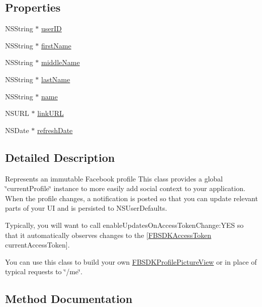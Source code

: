 \subsection*{Properties}
\begin{DoxyCompactItemize}
\item 
N\+S\+String $\ast$ \hyperlink{interface_f_b_s_d_k_profile_a26a7f698acf093c0d7e2be81532d1d67}{user\+I\+D}
\item 
N\+S\+String $\ast$ \hyperlink{interface_f_b_s_d_k_profile_a31272e40b64d9f34df275b6fcd79fc7b}{first\+Name}
\item 
N\+S\+String $\ast$ \hyperlink{interface_f_b_s_d_k_profile_a27ffc05364ad2ebef222c9fb97a1369b}{middle\+Name}
\item 
N\+S\+String $\ast$ \hyperlink{interface_f_b_s_d_k_profile_ae6eb49fec06e9a53af370a18ab54e4a1}{last\+Name}
\item 
N\+S\+String $\ast$ \hyperlink{interface_f_b_s_d_k_profile_ac9dc573eea0b89119bc6564618cf959f}{name}
\item 
N\+S\+U\+R\+L $\ast$ \hyperlink{interface_f_b_s_d_k_profile_ad18140af79f94f03a1317ff4cb1a5b31}{link\+U\+R\+L}
\item 
N\+S\+Date $\ast$ \hyperlink{interface_f_b_s_d_k_profile_aef99209a7a849699d65189f37d90cfb7}{refresh\+Date}
\end{DoxyCompactItemize}


\subsection{Detailed Description}
Represents an immutable Facebook profile  This class provides a global \char`\"{}current\+Profile\char`\"{} instance to more easily add social context to your application. When the profile changes, a notification is posted so that you can update relevant parts of your U\+I and is persisted to N\+S\+User\+Defaults.

Typically, you will want to call {\ttfamily enable\+Updates\+On\+Access\+Token\+Change\+:Y\+E\+S} so that it automatically observes changes to the {\ttfamily \mbox{[}\hyperlink{interface_f_b_s_d_k_access_token}{F\+B\+S\+D\+K\+Access\+Token} current\+Access\+Token\mbox{]}}.

You can use this class to build your own {\ttfamily \hyperlink{interface_f_b_s_d_k_profile_picture_view}{F\+B\+S\+D\+K\+Profile\+Picture\+View}} or in place of typical requests to \char`\"{}/me\char`\"{}. 

\subsection{Method Documentation}
\hypertarget{interface_f_b_s_d_k_profile_a38bbb7b3aa2faccef349a8ecca18f78d}{}
